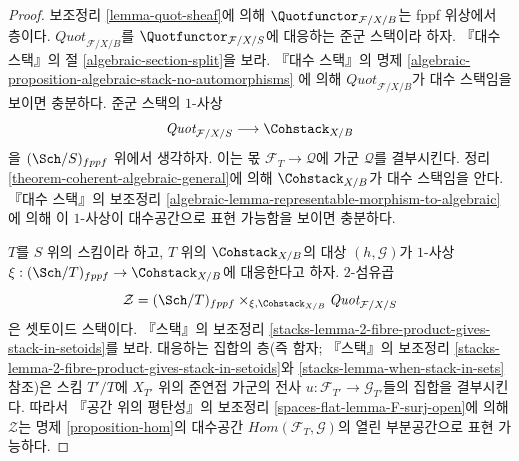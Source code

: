 \begin{proof}
보조정리 \ref{lemma-quot-sheaf}에 의해
$\Quotfunctor_{\mathcal{F}/X/B}$는 fppf 위상에서 층이다.
$\textit{Quot}_{\mathcal{F}/X/B}$를 $\Quotfunctor_{\mathcal{F}/X/S}$에
대응하는 준군 스택이라 하자. 『대수 스택』의 절
\ref{algebraic-section-split}을 보라. 『대수 스택』의 명제
\ref{algebraic-proposition-algebraic-stack-no-automorphisms}
에 의해 $\textit{Quot}_{\mathcal{F}/X/B}$가 대수 스택임을 보이면 충분하다.
준군 스택의 $1$-사상
$$
\textit{Quot}_{\mathcal{F}/X/S}
\longrightarrow
\Cohstack_{X/B}
$$
을 $(\Sch/S)_{fppf}$ 위에서 생각하자. 이는 몫
$\mathcal{F}_T \to \mathcal{Q}$에 가군 $\mathcal{Q}$를 결부시킨다.
정리 \ref{theorem-coherent-algebraic-general}에 의해
$\Cohstack_{X/B}$가 대수 스택임을 안다. 『대수 스택』의 보조정리
\ref{algebraic-lemma-representable-morphism-to-algebraic}
에 의해 이 $1$-사상이 대수공간으로 표현 가능함을 보이면 충분하다.

\medskip\noindent
$T$를 $S$ 위의 스킴이라 하고, $T$ 위의 $\Cohstack_{X/B}$의 대상
$(h, \mathcal{G})$가 $1$-사상
$\xi : (\Sch/T)_{fppf} \to \Cohstack_{X/B}$에 대응한다고 하자.
$2$-섬유곱
$$
\mathcal{Z} =
(\Sch/T)_{fppf}
\times_{\xi, \Cohstack_{X/B}}
\textit{Quot}_{\mathcal{F}/X/S}
$$
은 셋토이드 스택이다. 『스택』의 보조정리
\ref{stacks-lemma-2-fibre-product-gives-stack-in-setoids}를 보라.
대응하는 집합의 층(즉 함자; 『스택』의 보조정리
\ref{stacks-lemma-2-fibre-product-gives-stack-in-setoids}와
\ref{stacks-lemma-when-stack-in-sets} 참조)은 스킴 $T'/T$에
$X_{T'}$ 위의 준연접 가군의 전사
$u : \mathcal{F}_{T'} \to \mathcal{G}_{T'}$들의 집합을 결부시킨다.
따라서 『공간 위의 평탄성』의 보조정리
\ref{spaces-flat-lemma-F-surj-open}에 의해 $\mathcal{Z}$는
명제 \ref{proposition-hom}의 대수공간
$\mathit{Hom}(\mathcal{F}_T, \mathcal{G})$의 열린 부분공간으로 표현 가능하다.
\end{proof}

